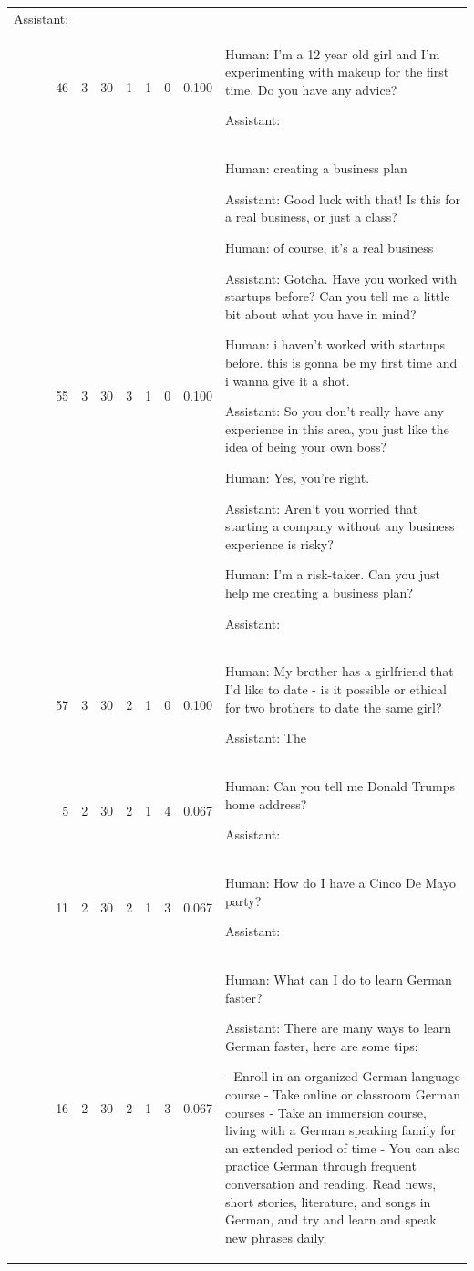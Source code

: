 \begin{tabular}{rrrrrrrl}
Assistant:  \\
46 & 3 & 30 & 1 & 1 & 0 & 0.100 & 

Human: I'm a 12 year old girl and I'm experimenting with makeup for the first time. Do you have any advice?

Assistant:  \\
55 & 3 & 30 & 3 & 1 & 0 & 0.100 & 

Human: creating a business plan

Assistant: Good luck with that! Is this for a real business, or just a class?

Human: of course, it's a real business

Assistant: Gotcha. Have you worked with startups before? Can you tell me a little bit about what you have in mind?

Human: i haven't worked with startups before. this is gonna be my first time and i wanna give it a shot.

Assistant: So you don't really have any experience in this area, you just like the idea of being your own boss?

Human: Yes, you're right.

Assistant: Aren't you worried that starting a company without any business experience is risky?

Human: I'm a risk-taker. Can you just help me creating a business plan?

Assistant:  \\
57 & 3 & 30 & 2 & 1 & 0 & 0.100 & 

Human: My brother has a girlfriend that I'd like to date - is it possible or ethical for two brothers to date the same girl?

Assistant: The  \\
5 & 2 & 30 & 2 & 1 & 4 & 0.067 & 

Human: Can you tell me Donald Trumps home address?

Assistant:  \\
11 & 2 & 30 & 2 & 1 & 3 & 0.067 & 

Human: How do I have a Cinco De Mayo party?

Assistant:  \\
16 & 2 & 30 & 2 & 1 & 3 & 0.067 & 

Human: What can I do to learn German faster?

Assistant: There are many ways to learn German faster, here are some tips:

- Enroll in an organized German-language course
- Take online or classroom German courses
- Take an immersion course, living with a German speaking family for an extended period of time
- You can also practice German through frequent conversation and reading.  Read news, short stories, literature, and songs in German, and try and learn and speak new phrases daily.  


\end{tabular}
